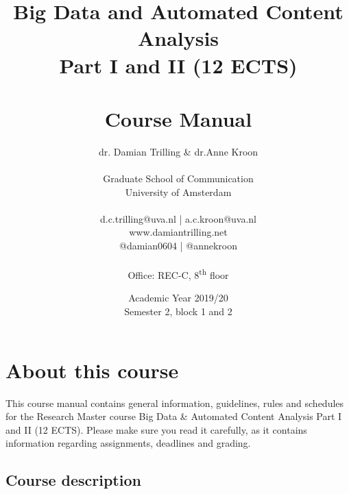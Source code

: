 \documentclass[a4paper,10pt]{report}
\title{Big Data and Automated Content Analysis\\ Part I and II (12 ECTS)\\~\\Course Manual}
\author{dr. Damian Trilling \& dr.Anne Kroon \\~\\Graduate School of Communication\\University of Amsterdam\\~\\d.c.trilling@uva.nl | a.c.kroon@uva.nl \\www.damiantrilling.net\\@damian0604 | @annekroon \\~\\Office: REC-C, 8\textsuperscript{th} floor}
\date{Academic Year 2019/20\\Semester 2, block 1 and 2}
\begin{document}
\maketitle



\chapter{About this course}

This course manual contains general information, guidelines, rules and schedules for the Research Master course Big Data \& Automated Content Analysis Part I and II (12 ECTS). Please make sure you read it carefully, as it  contains information regarding assignments, deadlines and grading.

\section{Course description}


\end{document}
